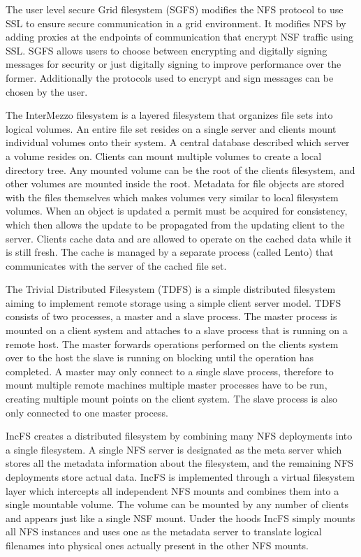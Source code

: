 The user level secure Grid filesystem (SGFS) \cite{Figueiredo2007} modifies
the NFS protocol to use SSL to ensure secure communication in a grid
environment. It modifies NFS by adding proxies at the endpoints of
communication that encrypt NSF traffic using SSL. SGFS allows users to choose
between encrypting and digitally signing messages for security or just
digitally signing to improve performance over the former. Additionally the
protocols used to encrypt and sign messages can be chosen by the user.


The InterMezzo \cite{Braam1999} filesystem is a layered filesystem that
organizes file sets into logical volumes. An entire file set resides on a
single server and clients mount individual volumes onto their system. A
central database described which server a volume resides on. Clients can mount
multiple volumes to create a local directory tree. Any mounted volume can be
the root of the clients filesystem, and other volumes are mounted inside the
root. Metadata for file objects are stored with the files themselves which
makes volumes very similar to local filesystem volumes. When an object is
updated a permit must be acquired for consistency, which then allows the
update to be propagated from the updating client to the server. Clients cache
data and are allowed to operate on the cached data while it is still fresh.
The cache is managed by a separate process (called Lento) that communicates
with the server of the cached file set.


The Trivial Distributed Filesystem (TDFS) \cite{Voras2006} is a simple
distributed filesystem aiming to implement remote storage using a simple
client server model. TDFS consists of two processes, a master and a slave
process. The master process is mounted on a client system and attaches to a
slave process that is running on a remote host. The master forwards operations
performed on the clients system over to the host the slave is running on
blocking until the operation has completed. A master may only connect to a
single slave process, therefore to mount multiple remote machines multiple
master processes have to be run, creating multiple mount points on the client
system. The slave process is also only connected to one master process.


IncFS \cite{Zhao2006} creates a distributed filesystem by combining many NFS
deployments into a single filesystem. A single NFS server is designated as the
meta server which stores all the metadata information about the filesystem,
and the remaining NFS deployments store actual data. IncFS is implemented
through a virtual filesystem layer which intercepts all independent NFS mounts
and combines them into a single mountable volume. The volume can be mounted by
any number of clients and appears just like a single NSF mount. Under the
hoods IncFS simply mounts all NFS instances and uses one as the metadata
server to translate logical filenames into physical ones actually present in
the other NFS mounts.


